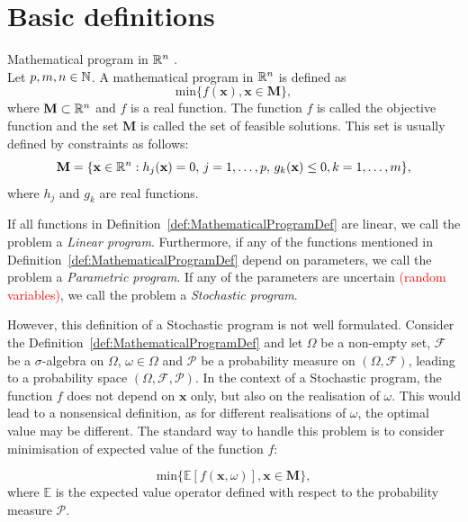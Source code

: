 \section{Basic definitions}
\begin{defn}{Mathematical program in $\mathbb{R}^n$ \cite[p. 107]{dupacovastochasticprogramming}}. \\
\label{def:MathematicalProgramDef}
Let $p,m,n \in \mathbb{N}$. A mathematical program in $\mathbb{R}^n$ is defined as
\begin{equation*}
\mathrm{min} \{f(\mathbf{x}), \mathbf{x} \in \mathbf{M}\},
\end{equation*}
where $\mathbf{M} \subset \mathbb{R}^n$ and $f$ is a real function. The function $f$ is called the objective function and the set $\mathbf{M}$ is called the set of feasible solutions. 
This set is usually defined by constraints as follows:
\begin{equation*}
	\mathbf{M} = \{\mathbf{x} \in \mathbb{R}^n: h_j(\mathbf{x})=0, \, j=1,\dots,p, \, g_k(\mathbf{x}) \leq 0, k=1,\dots,m \},
\end{equation*}
where $h_j$ and $g_k$ are real functions.
\end{defn}
If all functions in Definition~\ref{def:MathematicalProgramDef} are linear, we call the problem a \textit{Linear program}.
Furthermore, if any of the functions mentioned in Definition~\ref{def:MathematicalProgramDef} depend on parameters, we call the problem a \textit{Parametric program}. If any of the parameters are uncertain \textcolor{red}{(random variables)}, we call the problem a \textit{Stochastic program}.


However, this definition of a Stochastic program is not well formulated. Consider the Definition~\ref{def:MathematicalProgramDef} and let $\Omega$ be a non-empty set, $\mathcal{F}$ be a  $\sigma$-algebra on $\Omega$, $\omega \in \Omega$ and $\mathcal{P}$ be a probability measure on $(\Omega, \mathcal{F})$, leading to a probability space $(\Omega, \mathcal{F}, \mathcal{P})$. In the context of a Stochastic program, the function $f$ does not depend on $\mathbf{x}$ only, but also on the realisation of $\omega$. This would lead to a nonsensical definition, as for different realisations of $\omega$, the optimal value may be different. The standard way to handle this problem is to consider minimisation of expected value of the function $f$:

\begin{equation*}
\mathrm{min} \{\mathbb{E}\left[f(\mathbf{x}, \omega)\right], \mathbf{x} \in \mathbf{M}\},
\end{equation*}
where $\mathbb{E}$ is the expected value operator defined with respect to the probability measure $\mathcal{P}$. 


